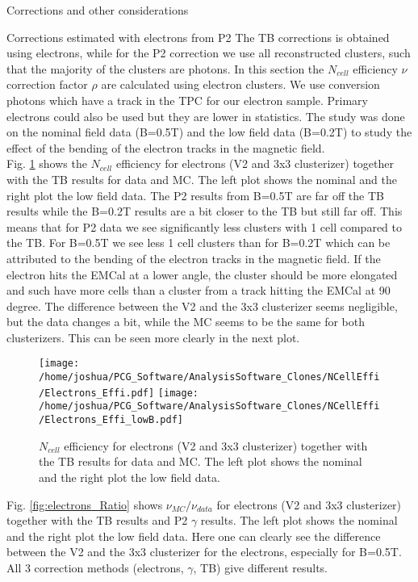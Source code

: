 \documentclass[ALICE]{ALICE_analysis_notes}
\begin{document}
\begin{section}{Corrections and other considerations}
\begin{subsection}{Corrections estimated with electrons from P2}
	\label{sec:electrons}
The TB corrections is obtained using electrons, while for the P2 correction we use all reconstructed clusters, such that the majority of the clusters are photons.
In this section the $N_{cell}$ efficiency $\nu$ correction factor $\rho$ are calculated using electron clusters. We use conversion photons which have a track in the TPC for our electron sample. Primary electrons could also be used but they are lower in statistics. The study was done on the nominal field data (B=0.5T) and the low field data (B=0.2T) to study the effect of the bending of the electron tracks in the magnetic field.\\
Fig. \ref{fig:electrons_Effi} shows the $N_{cell}$ efficiency for electrons (V2 and 3x3 clusterizer) together with the TB results for data and MC. The left plot shows the nominal and the right plot the low field data. The P2 results from B=0.5T are far off the TB results while the B=0.2T results are a bit closer to the TB but still far off. This means that for P2 data we see significantly less clusters with 1 cell compared to the TB. For B=0.5T we see less 1 cell clusters than for B=0.2T which can be attributed to the bending of the electron tracks in the magnetic field. If the electron hits the EMCal at a lower angle, the cluster should be more elongated and such have more cells than a cluster from a track hitting the EMCal at 90 degree.
The difference between the V2 and the 3x3 clusterizer seems negligible, but the data changes a bit, while the MC seems to be the same for both clusterizers. This can be seen more clearly in the next plot.


\begin{figure}[ht!]
	\centering
	\texttt{[image: /home/joshua/PCG\_Software/AnalysisSoftware\_Clones/NCellEffi/Electrons\_Effi.pdf]}	
	\texttt{[image: /home/joshua/PCG\_Software/AnalysisSoftware\_Clones/NCellEffi/Electrons\_Effi\_lowB.pdf]}
	
	\caption{ $N_{cell}$ efficiency for electrons (V2 and 3x3 clusterizer) together with the TB results for data and MC. The left plot shows the nominal and the right plot the low field data.   }
	\label{fig:electrons_Effi}
\end{figure}


Fig. \ref{fig:electrons_Ratio} shows $\nu_{MC}/\nu_{data}$ for electrons (V2 and 3x3 clusterizer) together with the TB results and P2 $\gamma$ results. The left plot shows the nominal and the right plot the low field data.
Here one can clearly see the difference between the V2 and the 3x3 clusterizer for the electrons, especially for B=0.5T. All 3 correction methods (electrons, $\gamma$, TB) give different results.



\end{subsection}
\end{section}
\end{document}
